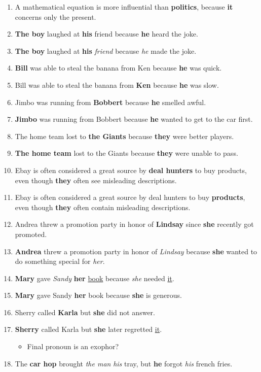 \documentclass{article}
\begin{document}
\begin{enumerate}
	\item A mathematical equation is more influential than {\bf politics}, because {\bf it} concerns only the present.
	\item {\bf The boy} laughed at {\bf his} friend because {\bf he} heard the joke.
	\item {\bf The boy} laughed at {\bf his} {\it friend} because {\it he} made the joke.
	\item {\bf Bill} was able to steal the banana from Ken because {\bf he} was quick.
	\item Bill was able to steal the banana from {\bf Ken} because {\bf he} was slow.
	\item Jimbo was running from {\bf Bobbert} because {\bf he} smelled awful.
	\item {\bf Jimbo} was running from Bobbert because {\bf he} wanted to get to the car first.
	\item The home team lost to {\bf the Giants} because {\bf they} were better players.
	\item {\bf The home team} lost to the Giants because {\bf they} were unable to pass.
	\item Ebay is often considered a great source by {\bf deal hunters} to buy products, even though {\bf they} often see misleading descriptions.
	\item Ebay is often considered a great source by deal hunters to buy {\bf products}, even though {\bf they} often contain misleading descriptions.
	\item Andrea threw a promotion party in honor of {\bf Lindsay} since {\bf she} recently got promoted.
	\item {\bf Andrea} threw a promotion party in honor of {\it Lindsay} because {\bf she} wanted to do something special for {\it her}.
	\item {\bf Mary}  gave {\it Sandy} {\bf her} \underline{book} because {\it she} needed \underline{it}.
	\item {\bf Mary} gave Sandy {\bf her} book because {\bf she} is generous.
	\item Sherry called {\bf Karla} but {\bf she} did not answer.
	\item {\bf Sherry} called Karla but {\bf she} later regretted \underline{it}.
		\begin{itemize}
			\item Final pronoun is an exophor?
		\end{itemize}
	\item The {\bf car hop} brought {\it the man} {\it his} tray, but {\bf he} forgot {\it his} french fries.

\end{enumerate}
\end{document}
